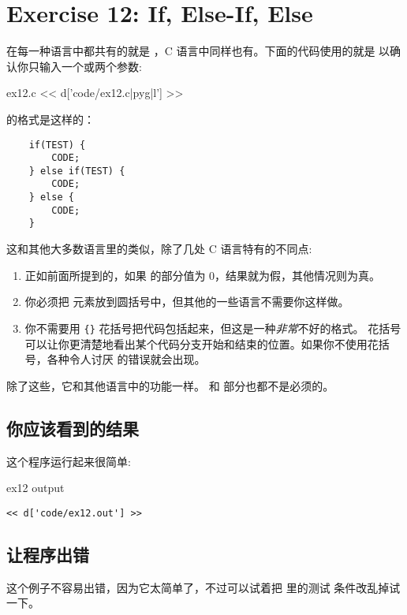 \chapter{Exercise 12: If, Else-If, Else}

在每一种语言中都共有的就是 ，C 语言中同样也有。下面的代码使用的就是 
以确认你只输入一个或两个参数:

\begin{code}{ex12.c}
<< d['code/ex12.c|pyg|l'] >>
\end{code}

的格式是这样的：

\begin{Verbatim}
    if(TEST) {
        CODE;
    } else if(TEST) {
        CODE;
    } else {
        CODE;
    }
\end{Verbatim}

这和其他大多数语言里的类似，除了几处 C 语言特有的不同点:

\begin{enumerate}
\item 正如前面所提到的，如果  的部分值为 0，结果就为假，其他情况则为真。
\item 你必须把  元素放到圆括号中，但其他的一些语言不需要你这样做。
\item 你不需要用 \verb|{}| 花括号把代码包括起来，但这是一种\emph{非常}不好的格式。
花括号可以让你更清楚地看出某个代码分支开始和结束的位置。如果你不使用花括号，各种令人讨厌
的错误就会出现。
\end{enumerate}

除了这些，它和其他语言中的功能一样。 和  部分也都不是必须的。

\section{你应该看到的结果}

这个程序运行起来很简单:

\begin{code}{ex12 output}
\begin{lstlisting}
<< d['code/ex12.out'] >>
\end{lstlisting}
\end{code}

\section{让程序出错}
这个例子不容易出错，因为它太简单了，不过可以试着把  里的测试
条件改乱掉试一下。

